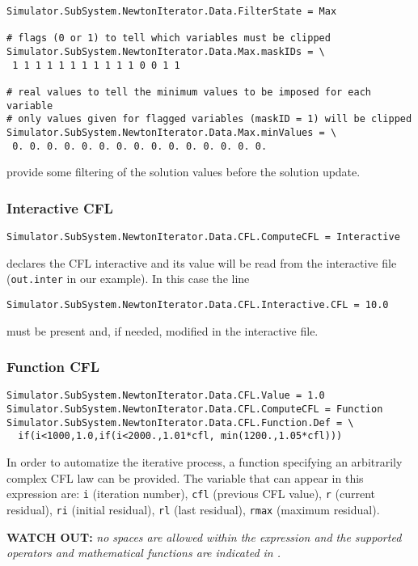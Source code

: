 \documentclass[11pt]{article}
\begin{document}
\begin{verbatim}
Simulator.SubSystem.NewtonIterator.Data.FilterState = Max

# flags (0 or 1) to tell which variables must be clipped
Simulator.SubSystem.NewtonIterator.Data.Max.maskIDs = \
 1 1 1 1 1 1 1 1 1 1 1 0 0 1 1

# real values to tell the minimum values to be imposed for each variable 
# only values given for flagged variables (maskID = 1) will be clipped
Simulator.SubSystem.NewtonIterator.Data.Max.minValues = \
 0. 0. 0. 0. 0. 0. 0. 0. 0. 0. 0. 0. 0. 0. 0.
\end{verbatim}
provide some filtering of the solution values before the solution update.  

\subsubsection{Interactive CFL}

\begin{verbatim}   
Simulator.SubSystem.NewtonIterator.Data.CFL.ComputeCFL = Interactive
\end{verbatim}
declares the CFL interactive and its value will be read from the interactive file ({\tt out.inter} in our example).
In this case the line
\begin{verbatim}
Simulator.SubSystem.NewtonIterator.Data.CFL.Interactive.CFL = 10.0
\end{verbatim}
must be present and, if needed, modified in the interactive file.

\subsubsection{Function CFL}

\begin{verbatim}   
Simulator.SubSystem.NewtonIterator.Data.CFL.Value = 1.0
Simulator.SubSystem.NewtonIterator.Data.CFL.ComputeCFL = Function
Simulator.SubSystem.NewtonIterator.Data.CFL.Function.Def = \
  if(i<1000,1.0,if(i<2000.,1.01*cfl, min(1200.,1.05*cfl)))
\end{verbatim}
In order to automatize the iterative process, a function specifying an arbitrarily complex CFL law can be provided.
The variable that can appear in this expression are: {\tt i} (iteration number), {\tt cfl} (previous CFL value), 
{\tt r} (current residual), {\tt ri} (initial residual), {\tt rl} (last residual), 
{\tt rmax} (maximum residual).

{\bf WATCH OUT:} {\it no spaces are allowed within the expression and the supported operators and mathematical functions
  are indicated in \cite{FParser}.}
\end{document}
